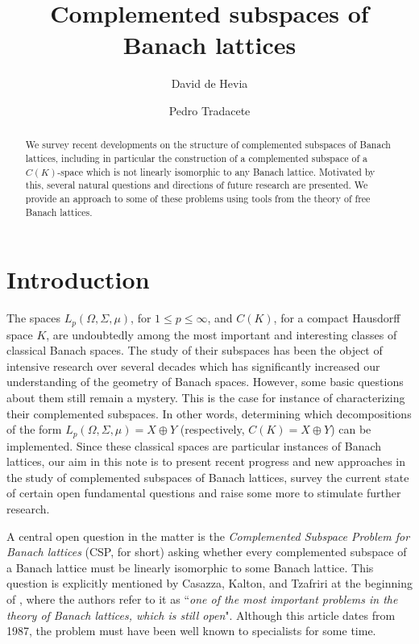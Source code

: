 \documentclass[11pt]{amsart}
\title[Complemented subspaces of Banach lattices]{Complemented subspaces of Banach lattices}
\author[de Hevia]{David de Hevia}
\author[Tradacete]{Pedro Tradacete}
\theoremstyle{definition}
\numberwithin{equation}{section}
\begin{document}
\begin{abstract}
    We survey recent developments on the structure of complemented subspaces of Banach lattices, including in particular the construction of a complemented subspace of a $C(K)$-space which is not linearly isomorphic to any Banach lattice. Motivated by this, several natural questions and directions of future research are presented. We provide an approach to some of these problems using tools from the theory of free Banach lattices. 
\end{abstract}

\maketitle
\nocite{*}
\section{Introduction}

The spaces $L_p(\Omega,\Sigma,\mu)$, for $1\leq p\leq \infty$, and $C(K)$, for a compact Hausdorff space $K$, are undoubtedly among the most important and interesting classes of classical Banach spaces. The study of their subspaces has been the object of intensive research over several decades which has significantly increased our understanding of the geometry of Banach spaces. However, some basic questions about them still remain a mystery. This is the case for instance of characterizing their complemented subspaces. In other words, determining which decompositions of the form $L_p(\Omega,\Sigma,\mu)=X\oplus Y$ (respectively, $C(K)=X\oplus Y$) can be implemented. Since these classical spaces are particular instances of Banach lattices, our aim in this note is to present recent progress and new approaches in the study of complemented subspaces of Banach lattices, survey the current state of certain open fundamental questions and raise some more to stimulate further research.

A central open question in the matter is the \textit{Complemented Subspace Problem for Banach lattices} (CSP, for short) asking whether every complemented subspace of a Banach lattice must be linearly isomorphic to some Banach lattice. This question is explicitly mentioned by Casazza, Kalton, and Tzafriri at the beginning of \cite{CKT87}, where the authors refer to it as ``\textit{one of the most important problems in the theory of Banach lattices, which is still open}". Although this article dates from 1987, the problem must have been well known to specialists for some time. 
\end{document}
